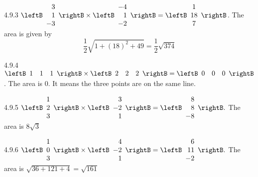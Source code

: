 \begin{Answer}{4.9.3}
 $\leftB \begin{array}{r}
3 \\
1 \\
-3
\end{array}
\rightB \times \leftB
\begin{array}{r}
 -4 \\
1 \\
-2
\end{array}
\rightB =\leftB
\begin{array}{c}
1 \\
18 \\
7
\end{array}
\rightB$. The area is given by
\[
\frac{1}{2}\sqrt{1+\left( 18\right) ^{2}+49}=\frac{1}{2}\sqrt{374}
\]
\end{Answer}
\begin{Answer}{4.9.4}
$\leftB
\begin{array}{rrr}
1 & 1 & 1
\end{array}
\rightB \times \leftB
\begin{array}{rrr}
 2 & 2 & 2
\end{array}
\rightB =\leftB
\begin{array}{ccc}
0 & 0 & 0
\end{array}
\rightB $.  The area is 0. It means the three points are on the same line.
\end{Answer}
\begin{Answer}{4.9.5}
$\leftB \begin{array}{r}
1 \\
2 \\
3
\end{array}
\rightB \times
\leftB
\begin{array}{r}
3 \\
-2 \\
1
\end{array}
\rightB =\leftB \begin{array}{r}
8 \\
8 \\
-8
\end{array}
\rightB .$ The area is $8\sqrt{3}$
\end{Answer}
\begin{Answer}{4.9.6}
$\leftB \begin{array}{r}
1 \\
0 \\
3
\end{array}
\rightB \times
\leftB
\begin{array}{r}
4 \\
-2 \\
1
\end{array}
\rightB =\leftB
\begin{array}{r}
6 \\
11 \\
-2
\end{array}
\rightB .$ The area is $\sqrt{36+121+4}= \sqrt{161}$
\end{Answer}
